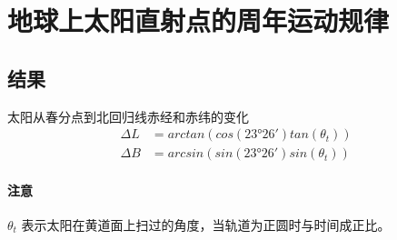 \section{地球上太阳直射点的周年运动规律}
\subsection{结果}
太阳从春分点到北回归线赤经和赤纬的变化
\begin{equation}
  \begin{split}
    \varDelta L &= arctan(cos(23°26') tan(\theta_t)) \\
    \varDelta B &= arcsin(sin(23°26') sin(\theta_t))
  \end{split}
\end{equation}
\paragraph{注意}
$ \theta_t $ 表示太阳在黄道面上扫过的角度，当轨道为正圆时与时间成正比。